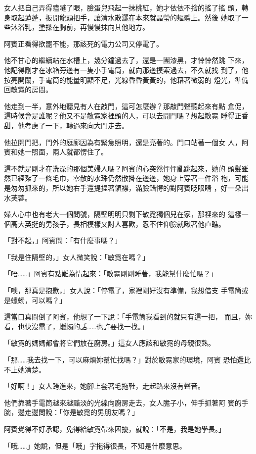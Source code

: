 女人把自己弄得瞌瞇了眼，臉蛋兒飛起一抹桃紅，她才依依不捨的搖了搖
頭，轉身取起蓮蓬，扳開龍頭把手，讓清水散灑在本來就晶瑩的軀體上。然後
她取了一些沐浴乳，塗搽在胸前，再慢慢抹向其他地方。

阿賓正看得欲罷不能，那該死的電力公司又停電了。

他不甘心的繼續站在水槽上，幾分鐘過去了，還是一團漆黑，才悻悻然跳
下來，他記得剛才在冰箱旁邊有一隻小手電筒，就向那邊摸索過去，不久就找
到了，他按亮開關，手電筒的能量明顯不足，光線昏昏黃黃的，他藉著微弱的
燈光，準備回敏霓的房間。

他走到一半，意外地聽見有人在敲門，這可怎麼辦？那敲門聲聽起來有點
倉促，這時候會是誰呢？他又不是敏霓家裡頭的人，可以去開門嗎？想起敏霓
睡得正香甜，他考慮了一下，轉過來向大門走去。

他拉開門把，門外的庭廊因為有緊急照明，還是亮著的。門口站著一個女
人，阿賓和她一照面，兩人就都愣住了。

這不就是剛才在洗澡的那個美婦人嗎？阿賓的心突然怦怦亂跳起來，她的
頭髮雖然已經紮了一條毛巾，零散的水珠仍然散掛在邊邊，她身上穿著一件浴
袍，可能是匆匆抓來的，所以她右手還提捏著領襟，滿臉錯愕的對阿賓眨眼睛
，好一朵出水芙蓉。

婦人心中也有老大一個問號，隔壁明明只剩下敏霓獨個兒在家，那裡來的
這樣一個高大英挺的男孩子，長相模樣又討人喜歡，忍不住仰臉就瞅著他直瞧。

「對不起，」阿賓問：「有什麼事嗎？」

「我是住隔壁的，」女人微笑說：「敏霓在嗎？」

「唔……」阿賓有點難為情起來：「敏霓剛剛睡著，我能幫什麼忙嗎？」

「噢，那真是抱歉，」女人說：「停電了，家裡剛好沒有準備，我想借支
手電筒或是蠟蠋，可以嗎？」

這當口真問倒了阿賓，他想了一下說：「手電筒我看到的就只有這一把，
而且，妳看，也快沒電了，蠟蠋的話……也許要找一找。」

「敏霓的媽媽都會將它們放在廚房。」這女人應該和敏霓的母親很熟。

「那……我去找一下，可以麻煩妳幫忙找嗎？」對於敏霓家的環境，阿賓
恐怕還比不上她清楚。

「好啊！」女人跨進來，她腳上套著毛拖鞋，走起路來沒有聲音。

他們靠著手電筒越來越黯淡的光線向廚房走去，女人膽子小，伸手抓著阿
賓的手腕，邊走邊問說：「你是敏霓的男朋友嗎？」

阿賓覺得不好承認，免得給敏霓帶來困擾，就說：「不是，我是她學長。」

「哦……」她說，但是「哦」字拖得很長，不知是什麼意思。

